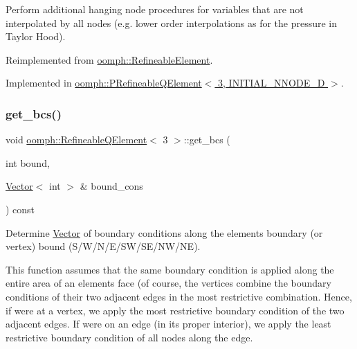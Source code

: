 Perform additional hanging node procedures for variables that are not interpolated by all nodes (e.\+g. lower order interpolations as for the pressure in Taylor Hood). 



Reimplemented from \hyperlink{classoomph_1_1RefineableElement_a86ea01c485f7ff822dce74b884312ccb}{oomph\+::\+Refineable\+Element}.



Implemented in \hyperlink{classoomph_1_1PRefineableQElement_3_013_00_01INITIAL__NNODE__1D_01_4_a502fd0f80738b3e7d185662595fbbb1b}{oomph\+::\+P\+Refineable\+Q\+Element$<$ 3, I\+N\+I\+T\+I\+A\+L\+\_\+\+N\+N\+O\+D\+E\+\_\+D $>$}.

\mbox{\label{classoomph_1_1RefineableQElement_3_013_01_4_aac2601ff8f740680675e5e6ba5c35e9d}} 
\subsubsection{\texorpdfstring{get\+\_\+bcs()}{get\_bcs()}}
{\footnotesize\ttfamily void \hyperlink{classoomph_1_1RefineableQElement}{oomph\+::\+Refineable\+Q\+Element}$<$ 3 $>$\+::get\+\_\+bcs (\begin{DoxyParamCaption}\item[{int}]{bound,  }\item[{\hyperlink{classoomph_1_1Vector}{Vector}$<$ int $>$ \&}]{bound\+\_\+cons }\end{DoxyParamCaption}) const\hspace{0.3cm}{\ttfamily [protected]}}



Determine \hyperlink{classoomph_1_1Vector}{Vector} of boundary conditions along the element\textquotesingle{}s boundary (or vertex) bound (S/\+W/\+N/\+E/\+S\+W/\+S\+E/\+N\+W/\+NE). 

This function assumes that the same boundary condition is applied along the entire area of an element\textquotesingle{}s face (of course, the vertices combine the boundary conditions of their two adjacent edges in the most restrictive combination. Hence, if we\textquotesingle{}re at a vertex, we apply the most restrictive boundary condition of the two adjacent edges. If we\textquotesingle{}re on an edge (in its proper interior), we apply the least restrictive boundary condition of all nodes along the edge.

